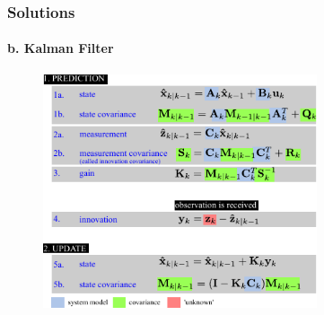\documentclass{beamer}
\begin{document}
\begin{frame}
\frametitle{Solutions}
\framesubtitle{b. Kalman Filter}
\mypagenum
\begin{figure}
\includegraphics[width=0.72\textwidth]{figs/TRK_KalmanFilter_equations2.pdf}
\end{figure}
\end{frame}



%
%
%






\end{document}
